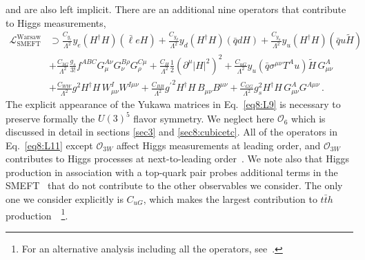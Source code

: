 \documentclass[../report.tex]{subfiles}
\begin{document}
and are also left implicit.
There are an additional nine operators that contribute to Higgs measurements, 
%
{\small
\begin{align}
\label{eq8:L9}
\mathcal{L}_\text{SMEFT}^\text{Warsaw} &\supset  \frac{C_{y_e}}{\Lambda^2} y_e (H^\dag H)(\bar \ell e H) + \frac{C_{y_d}}{\Lambda^2} y_d (H^\dag H)(\bar q d H) + \frac{C_{y_u}}{\Lambda^2} y_u (H^\dag H)(\bar q u \widetilde H) \nonumber \\
&+ \frac{C_{3G}}{\Lambda^2} \frac{g_s}{3!} f^{ABC} G_\mu^{A\nu} G_\nu^{B\rho} G_\rho^{C\mu}  + \frac{C_{H}}{\Lambda^2} \frac{1}{2}\left(\partial^\mu |H|^2\right)^2  + \frac{C_{uG}}{\Lambda^2} y_u (\bar q \sigma^{\mu\nu} T^A u) \widetilde H \, G_{\mu\nu}^A   \nonumber \\
&+ \frac{C_{WW}}{\Lambda^2} g^2 H^\dag H\, W^I_{\mu\nu} W^{I\mu\nu} + \frac{C_{BB}}{\Lambda^2} {g^\prime}^2 H^\dag H\, B_{\mu\nu} B^{\mu\nu} + \frac{C_{GG}}{\Lambda^2} g_s^2 H^\dag H\, G^A_{\mu\nu} G^{A\mu\nu} \, .
\end{align}}
The explicit appearance of the Yukawa matrices in Eq.~\eqref{eq8:L9} is necessary to preserve formally the $U(3)^5$ flavor symmetry.
We neglect here $\mathcal{O}_6$ which is discussed in detail in sections \ref{sec3} and \ref{sec8:cubicetc}.
All of the operators in Eq.~\eqref{eq8:L11} except $\mathcal{O}_{3W}$ affect Higgs measurements at leading order, and
$\mathcal{O}_{3W}$ contributes to Higgs processes at next-to-leading order~\cite{Alonso:2013hga, Hartmann:2015oia, Hartmann:2015aia, Dedes:2018seb, Dawson:2018liq}.
We note also that Higgs production in association with a top-quark pair probes additional terms in the 
SMEFT~\cite{Maltoni:2016yxb, AguilarSaavedra:2018nen, Ellis:2018gqa} that do not contribute to the other observables we consider.
The only one we consider explicitly is $C_{uG}$, which makes the largest contribution to $t \bar{t} h$ production~\cite{Ellis:2018gqa}~\footnote{For 
an alternative analysis including all the operators, see~\cite{Murphy:2017omb}.}.
\end{document}
